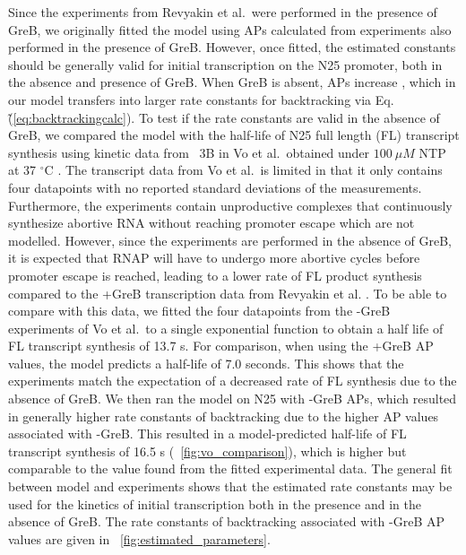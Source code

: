 Since the experiments from Revyakin et al.\ were performed in the presence of
GreB, we originally fitted the model using APs calculated from experiments
also performed in the presence of GreB. However, once fitted, the estimated
constants should be generally valid for initial transcription on the N25
promoter, both in the absence and presence of GreB. When GreB is absent, APs
increase \cite{hsu_initial_2006}, which in our model transfers into larger
rate constants for backtracking via Eq.\~(\ref{eq:backtrackingcalc}). To test
if the rate constants are valid in the absence of GreB, we compared the model
with the half-life of N25 full length (FL) transcript synthesis using kinetic
data from \FIG~3B in Vo et al.\, obtained under $100\ \mu M$ NTP at 37
$^{\circ}$C \cite{vo_vitro_2003-1}. The transcript data from Vo et al.\ is
limited in that it only contains four datapoints with no reported standard
deviations of the measurements. Furthermore, the experiments contain
unproductive complexes that continuously synthesize abortive RNA without
reaching promoter escape \cite{vo_vitro_2003-1} which are not modelled.
However, since the experiments are performed in the absence of GreB, it is
expected that RNAP will have to undergo more abortive cycles before promoter
escape is reached, leading to a lower rate of FL product synthesis compared to
the +GreB transcription data from Revyakin et al.
\cite{revyakin_abortive_2006}. To be able to compare with this data, we fitted
the four datapoints from the -GreB experiments of Vo et al.\ to a single
exponential function to obtain a half life of FL transcript synthesis of 13.7
s. For comparison, when using the +GreB AP values, the model predicts a
half-life of 7.0 seconds. This shows that the experiments match the
expectation of a decreased rate of FL synthesis due to the absence of GreB. We
then ran the model on N25 with -GreB APs, which resulted in generally higher
rate constants of backtracking due to the higher AP values associated with
-GreB. This resulted in a model-predicted half-life of FL transcript synthesis
of 16.5 s (\FIG~\ref{fig:vo_comparison}), which is higher but comparable to
the value found from the fitted experimental data. The general fit between
model and experiments shows that the estimated rate constants may be used for
the kinetics of initial transcription both in the presence and in the absence
of GreB. The rate constants of backtracking associated with -GreB AP values
are given in \FIG~\ref{fig:estimated_parameters}.

